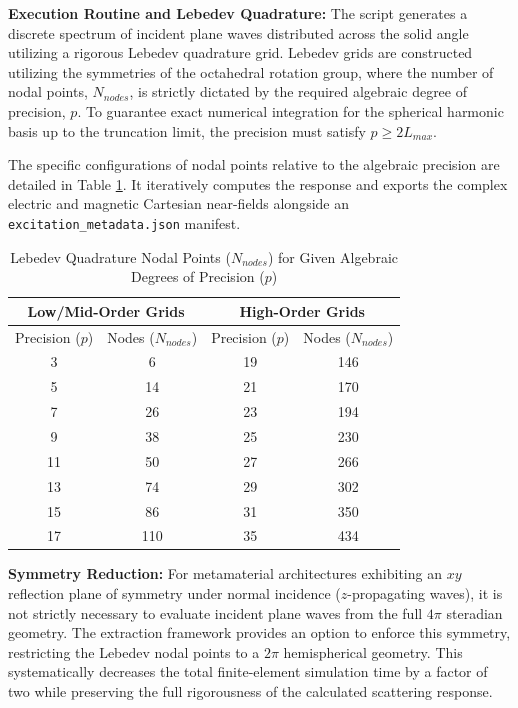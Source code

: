 \documentclass[11pt,a4paper]{article}
\begin{document}
\textbf{Execution Routine and Lebedev Quadrature:} 
The script generates a discrete spectrum of incident plane waves distributed across the solid angle utilizing a rigorous Lebedev quadrature grid. Lebedev grids are constructed utilizing the symmetries of the octahedral rotation group, where the number of nodal points, $N_{nodes}$, is strictly dictated by the required algebraic degree of precision, $p$. To guarantee exact numerical integration for the spherical harmonic basis up to the truncation limit, the precision must satisfy $p \ge 2L_{max}$. 

The specific configurations of nodal points relative to the algebraic precision are detailed in Table \ref{tab:lebedev}. It iteratively computes the response and exports the complex electric and magnetic Cartesian near-fields alongside an \texttt{excitation\_metadata.json} manifest.

\begin{table}[h]
\centering
\caption{Lebedev Quadrature Nodal Points ($N_{nodes}$) for Given Algebraic Degrees of Precision ($p$)}
\label{tab:lebedev}
\begin{tabular}{|c|c||c|c|}
\hline
\multicolumn{2}{|c||}{\textbf{Low/Mid-Order Grids}} & \multicolumn{2}{c|}{\textbf{High-Order Grids}} \\
\hline
Precision ($p$) & Nodes ($N_{nodes}$) & Precision ($p$) & Nodes ($N_{nodes}$) \\
\hline
3 & 6 & 19 & 146 \\
5 & 14 & 21 & 170 \\
7 & 26 & 23 & 194 \\
9 & 38 & 25 & 230 \\
11 & 50 & 27 & 266 \\
13 & 74 & 29 & 302 \\
15 & 86 & 31 & 350 \\
17 & 110 & 35 & 434 \\
\hline
\end{tabular}
\end{table}

\textbf{Symmetry Reduction:} For metamaterial architectures exhibiting an $xy$ reflection plane of symmetry under normal incidence ($z$-propagating waves), it is not strictly necessary to evaluate incident plane waves from the full $4\pi$ steradian geometry. The extraction framework provides an option to enforce this symmetry, restricting the Lebedev nodal points to a $2\pi$ hemispherical geometry. This systematically decreases the total finite-element simulation time by a factor of two while preserving the full rigorousness of the calculated scattering response.
\end{document}
